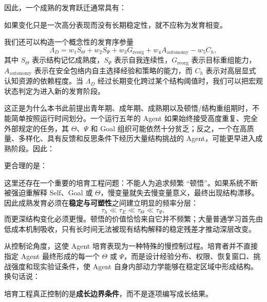 因此，一个成熟的发育跃迁通常具有：
\begin{statementbox}
\centering
{}
\end{statementbox}
如果变化只是一次高分表现而没有长期稳定性，就不应称为发育相变。

我们还可以构造一个概念性的发育序参量
\[
\Lambda_D
=
w_1S_\Theta
+
w_2S_\Psi
+
w_3G_{\mathrm{reorg}}
+
w_4A_{\mathrm{autonomy}}
-
w_5C_h,
\]
其中 $S_\Theta$ 表示结构记忆成熟度，$S_\Psi$ 表示自我连续性，$G_{\mathrm{reorg}}$ 表示目标重组能力，$A_{\mathrm{autonomy}}$ 表示在安全包络内自主选择经验和策略的能力，而 $C_h$ 表示对高层显式认知资源的依赖程度。当 $\Lambda_D$ 经过长期变化跨过某个结构阈值时，我们可以把宏观状态判定为进入新的发育阶段。

这正是为什么本书此前提出青年期、成年期、成熟期以及顿悟/结构重组期时，不能简单按照运行时间划分。一个运行五年的 Agent 如果始终接受高度重复、完全外部规定的任务，其 $\Theta$、$\Psi$ 和 Goal 组织可能依然十分贫乏；反之，一个在高质量、多样化、具有反馈和反思条件下经历大量结构挑战的 Agent，可能更早进入成熟阶段。因此：
\begin{statementbox}
\centering
{}
\end{statementbox}
更合理的是：
\begin{statementbox}
\centering
{}
\end{statementbox}

这里还存在一个重要的培育工程问题：不能人为追求频繁 ``顿悟''。如果系统不断被强迫重解释 Self、Goal 或 $\Theta$，慢变量就失去慢变量意义，最终出现结构漂移。因此成熟发育必须在\textbf{稳定与可塑性}之间建立明显的频率分层：
\[
\tau_h
\ll
\tau_E
\ll
\tau_\Theta
\ll
\tau_\Psi,
\]
而更深结构变化必须更慢。顿悟的价值恰恰来自它并不频繁；大量普通学习首先由低成本机制吸收，只有长时间无法被现有结构解释的稳定残差才推动深层改变。

从控制论角度，这使 Agent 培育表现为一种特殊的慢控制过程。培育者并不直接指定 Agent 最终形成的每一个 $\Theta$ 或 $\Psi$，而是设计经验分布、权限、恢复窗口、挑战强度和现实验证条件，使 Agent 自身内部动力学能够在稳定区域中形成结构。换句话说：
\begin{statementbox}
\centering
{}
\end{statementbox}
培育工程真正控制的是\textbf{成长边界条件}，而不是逐项编写成长结果。

